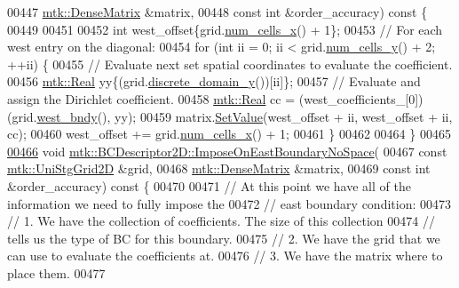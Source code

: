\begin{DoxyCode}
00447     \hyperlink{classmtk_1_1DenseMatrix}{mtk::DenseMatrix} &matrix,
00448     \textcolor{keyword}{const} \textcolor{keywordtype}{int} &order\_accuracy)\textcolor{keyword}{ const }\{
00449 
00451 
00452   \textcolor{keywordtype}{int} west\_offset\{grid.\hyperlink{classmtk_1_1UniStgGrid2D_a2d182866a398aba8e4829590e85bf939}{num\_cells\_x}() + 1\};
00453   \textcolor{comment}{// For each west entry on the diagonal:}
00454   \textcolor{keywordflow}{for} (\textcolor{keywordtype}{int} ii = 0; ii < grid.\hyperlink{classmtk_1_1UniStgGrid2D_aed05a801cc9a76dba0ff203cea58a61a}{num\_cells\_y}() + 2; ++ii) \{
00455     \textcolor{comment}{// Evaluate next set spatial coordinates to evaluate the coefficient.}
00456     \hyperlink{group__c01-roots_gac080bbbf5cbb5502c9f00405f894857d}{mtk::Real} yy\{(grid.\hyperlink{classmtk_1_1UniStgGrid2D_ac33a58d65105550dcf6f6b92b48b5105}{discrete\_domain\_y}())[ii]\};
00457     \textcolor{comment}{// Evaluate and assign the Dirichlet coefficient.}
00458     \hyperlink{group__c01-roots_gac080bbbf5cbb5502c9f00405f894857d}{mtk::Real} cc = (west\_coefficients\_[0])(grid.\hyperlink{classmtk_1_1UniStgGrid2D_af2b1712387ded85edaf2b64617d3fc13}{west\_bndy}(), yy);
00459     matrix.\hyperlink{classmtk_1_1DenseMatrix_a784ce5784109ac86bfb9d8562b334b13}{SetValue}(west\_offset + ii, west\_offset + ii, cc);
00460     west\_offset += grid.\hyperlink{classmtk_1_1UniStgGrid2D_a2d182866a398aba8e4829590e85bf939}{num\_cells\_x}() + 1;
00461   \}
00462 
00464 \}
00465 
\hypertarget{mtk__bc__descriptor__2d_8cc_source_l00466}{}\hyperlink{classmtk_1_1BCDescriptor2D_a65f58f43f3fdc793cce7293780b70b80}{00466} \textcolor{keywordtype}{void} \hyperlink{classmtk_1_1BCDescriptor2D_a65f58f43f3fdc793cce7293780b70b80}{mtk::BCDescriptor2D::ImposeOnEastBoundaryNoSpace}(
00467     \textcolor{keyword}{const} \hyperlink{classmtk_1_1UniStgGrid2D}{mtk::UniStgGrid2D} &grid,
00468     \hyperlink{classmtk_1_1DenseMatrix}{mtk::DenseMatrix} &matrix,
00469     \textcolor{keyword}{const} \textcolor{keywordtype}{int} &order\_accuracy)\textcolor{keyword}{ const }\{
00470 
00471   \textcolor{comment}{// At this point we have all of the information we need to fully impose the}
00472   \textcolor{comment}{// east boundary condition:}
00473   \textcolor{comment}{// 1. We have the collection of coefficients. The size of this collection}
00474   \textcolor{comment}{// tells us the type of BC for this boundary.}
00475   \textcolor{comment}{// 2. We have the grid that we can use to evaluate the coefficients at.}
00476   \textcolor{comment}{// 3. We have the matrix where to place them.}
00477 

\end{DoxyCode}
